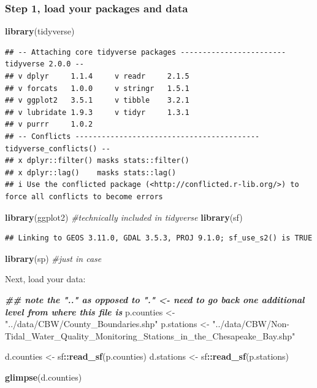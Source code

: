 \documentclass[]{article}
\newenvironment{Shaded}{\begin{snugshade}}{\end{snugshade}}
\newcommand{\CommentTok}[1]{\textcolor[rgb]{0.56,0.35,0.01}{\textit{#1}}}
\newcommand{\DocumentationTok}[1]{\textcolor[rgb]{0.56,0.35,0.01}{\textbf{\textit{#1}}}}
\newcommand{\FunctionTok}[1]{\textcolor[rgb]{0.13,0.29,0.53}{\textbf{#1}}}
\newcommand{\NormalTok}[1]{#1}
\newcommand{\OtherTok}[1]{\textcolor[rgb]{0.56,0.35,0.01}{#1}}
\newcommand{\SpecialCharTok}[1]{\textcolor[rgb]{0.81,0.36,0.00}{\textbf{#1}}}
\newcommand{\StringTok}[1]{\textcolor[rgb]{0.31,0.60,0.02}{#1}}
\begin{document}
\subsubsection{Step 1, load your packages and
data}\label{step-1-load-your-packages-and-data}

\begin{Shaded}
\begin{Highlighting}[]
\FunctionTok{library}\NormalTok{(tidyverse)}
\end{Highlighting}
\end{Shaded}

\begin{verbatim}
## -- Attaching core tidyverse packages ------------------------ tidyverse 2.0.0 --
## v dplyr     1.1.4     v readr     2.1.5
## v forcats   1.0.0     v stringr   1.5.1
## v ggplot2   3.5.1     v tibble    3.2.1
## v lubridate 1.9.3     v tidyr     1.3.1
## v purrr     1.0.2     
## -- Conflicts ------------------------------------------ tidyverse_conflicts() --
## x dplyr::filter() masks stats::filter()
## x dplyr::lag()    masks stats::lag()
## i Use the conflicted package (<http://conflicted.r-lib.org/>) to force all conflicts to become errors
\end{verbatim}

\begin{Shaded}
\begin{Highlighting}[]
\FunctionTok{library}\NormalTok{(ggplot2) }\CommentTok{\#technically included in tidyverse}
\FunctionTok{library}\NormalTok{(sf)}
\end{Highlighting}
\end{Shaded}

\begin{verbatim}
## Linking to GEOS 3.11.0, GDAL 3.5.3, PROJ 9.1.0; sf_use_s2() is TRUE
\end{verbatim}

\begin{Shaded}
\begin{Highlighting}[]
\FunctionTok{library}\NormalTok{(sp) }\CommentTok{\#just in case}
\end{Highlighting}
\end{Shaded}

Next, load your data:

\begin{Shaded}
\begin{Highlighting}[]
\DocumentationTok{\#\# note the ".." as opposed to "." \textless{}{-} need to go back one additional level from where this file is}
\NormalTok{p.counties }\OtherTok{\textless{}{-}} \StringTok{"../data/CBW/County\_Boundaries.shp"}
\NormalTok{p.stations }\OtherTok{\textless{}{-}} \StringTok{"../data/CBW/Non{-}Tidal\_Water\_Quality\_Monitoring\_Stations\_in\_the\_Chesapeake\_Bay.shp"}


\NormalTok{d.counties }\OtherTok{\textless{}{-}}\NormalTok{ sf}\SpecialCharTok{::}\FunctionTok{read\_sf}\NormalTok{(p.counties)}
\NormalTok{d.stations }\OtherTok{\textless{}{-}}\NormalTok{ sf}\SpecialCharTok{::}\FunctionTok{read\_sf}\NormalTok{(p.stations)}

\FunctionTok{glimpse}\NormalTok{(d.counties)}
\end{Highlighting}
\end{Shaded}
\end{document}
